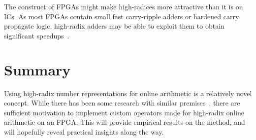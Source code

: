 The construct of FPGAs might make high-radices more attractive than it is on ICs.
As most FPGAs contain small fast carry-ripple adders or hardened carry propagate logic, high-radix adders may be able to exploit them to obtain significant speedups~\cite{Kornerup1}.

\section{Summary}
Using high-radix number representations for online arithmetic is a relatively novel concept.
While there has been some research with similar premises~\cite{Lynch1}\cite{Lynch2}, there are sufficient motivation to implement custom operators made for high-radix online arithmetic on an FPGA.
This will provide empirical results on the method, and will hopefully reveal practical insights along the way.
